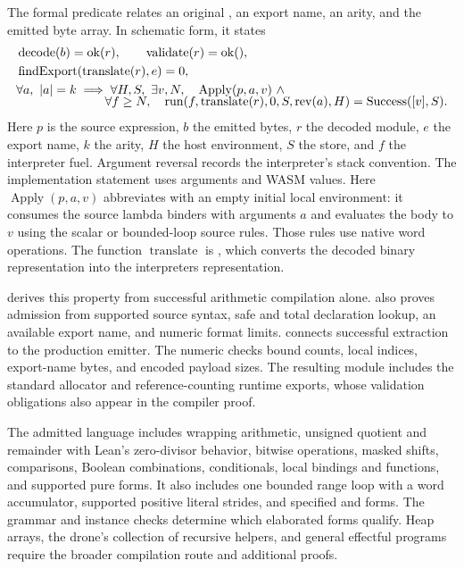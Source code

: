 \documentclass[11pt]{article}
\begin{document}
The formal predicate  relates an original , an export name, an arity, and the emitted byte array.  In schematic form, it states
\begin{align*}
 &\operatorname{decode}(b)=\operatorname{ok}(r),\qquad
   \operatorname{validate}(r)=\operatorname{ok}(),\\
 &\operatorname{findExport}(\operatorname{translate}(r),e)=0,\\
 &\forall a,\ |a|=k\;\Longrightarrow\;\forall H,S,\ \exists v,N,\quad
   \operatorname{Apply}(p,a,v)\ \land\\[-2mm]
 &\hspace{25mm}\forall f\geq N,\quad
   \operatorname{run}(f,\operatorname{translate}(r),0,S,\operatorname{rev}(a),H)
   =\operatorname{Success}([v],S).
\end{align*}
Here $p$ is the source expression, $b$ the emitted bytes, $r$ the decoded module, $e$ the export name, $k$ the arity, $H$ the host environment, $S$ the store, and $f$ the interpreter fuel.  Argument reversal records the interpreter's stack convention.  The implementation statement uses  arguments and WASM  values.  Here $\operatorname{Apply}(p,a,v)$ abbreviates  with an empty initial local environment: it consumes the source lambda binders with arguments $a$ and evaluates the body to $v$ using the scalar or bounded-loop source rules.  Those rules use native word operations.  The function $\operatorname{translate}$ is , which converts the decoded binary representation into the interpreter\textquotesingle s  representation.

 derives this property from successful arithmetic compilation alone.   also proves admission from supported source syntax, safe and total declaration lookup, an available export name, and numeric format limits.   connects successful extraction to the production  emitter.  The numeric checks bound counts, local indices, export-name bytes, and encoded payload sizes.  The resulting module includes the standard allocator and reference-counting runtime exports, whose validation obligations also appear in the compiler proof.

The admitted language includes wrapping  arithmetic, unsigned quotient and remainder with Lean's zero-divisor behavior, bitwise operations, masked shifts, comparisons, Boolean combinations, conditionals, local bindings and functions, and supported pure  forms.  It also includes one bounded range loop with a word accumulator, supported positive literal strides, and specified  and  forms.  The grammar and instance checks determine which elaborated forms qualify.  Heap arrays, the drone's collection of recursive helpers, and general effectful programs require the broader compilation route and additional proofs.
\end{document}
